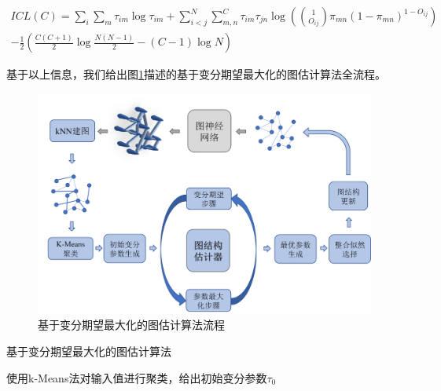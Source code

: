 \begin{equation}\label{equ:ICL}
  \begin{aligned}
ICL(C)=\sum_i\sum_m\tau_{im} \log \tau_{im} +\sum_{i<j}^N\sum_{m,n}^C\tau_{im}\tau_{jn}\log ( \binom{1}{O_{ij}}\pi_{mn}(1-\pi_{mn})^{1-O_{ij}})\\-\frac{1}{2}(\frac{C(C+1)}{2}\log \frac{N(N-1)}{2}-(C-1)\log N)
\end{aligned}\end{equation}

基于以上信息，我们给出图\ref{fig:Estimator}描述的基于变分期望最大化的图估计算法全流程。

\begin{figure}[!ht]
  \centering
  \includegraphics[width=\textwidth]{./figures/Chapter3/Estimator.png}
  \caption{基于变分期望最大化的图估计算法流程} \label{fig:Estimator}
\end{figure}

\begin{algorithm}
\label{algo:VEM}
\SetAlgoLined
\caption{基于变分期望最大化的图估计算法}

使用k-Means法对输入值进行聚类，给出初始变分参数$\tau_0$

\end{algorithm}

